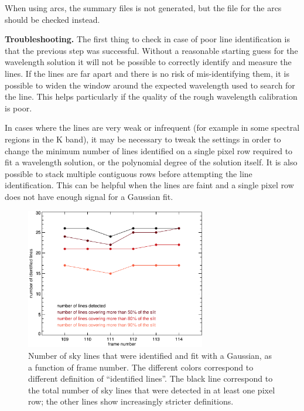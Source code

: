 \documentclass[a4paper]{article}
\begin{document}
\begin{sloppypar}
When using arcs, the summary files is not generated, but the  file for the arcs should be checked instead.

\medskip
\noindent
\textbf{Troubleshooting.} The first thing to check in case of poor line identification is that the previous step was successful. Without a reasonable starting guess for the wavelength solution it will not be possible to correctly identify and measure the lines. If the lines are far apart and there is no risk of mis-identifying them, it is possible to widen the window around the expected wavelength used to search for the line. This helps particularly if the quality of the rough wavelength calibration is poor.

In cases where the lines are very weak or infrequent (for example in some spectral regions in the K band), it may be necessary to tweak the settings in order to change the minimum number of lines identified on a single pixel row required to fit a wavelength solution, or the polynomial degree of the solution itself. It is also possible to stack multiple contiguous rows before attempting the line identification. This can be helpful when the lines are faint and a single pixel row does not have enough signal for a Gaussian fit.


\begin{figure}[tbp]
\centering
\includegraphics[width=0.7\textwidth]{number_lines}
\caption{Number of sky lines that were identified and fit with a Gaussian, as a function of frame number. The different colors correspond to different definition of ``identified lines''. The black line correspond to the total number of sky lines that were detected in at least one pixel row; the other lines show increasingly stricter definitions.}
\label{fig:number_lines}
\end{figure}



\end{sloppypar}
\end{document}
